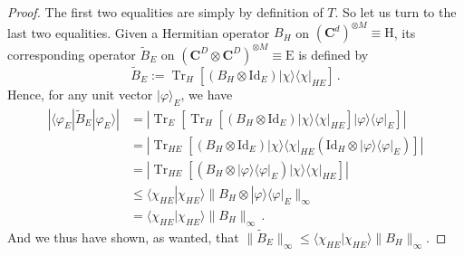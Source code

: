 \documentclass{amsart}
\newcommand{\C}{\mathbf{C}}
\renewcommand{\leq}{\leqslant}
\newcommand{\Id}{\mathrm{Id}}
\DeclareMathOperator{\Tr}{Tr}
\newcommand{\braket}[2]{\langle #1 | #2\rangle}
\newcommand{\ketbra}[2]{| #1 \rangle\!\langle #2 |}
\newcommand{\bra}[1]{\langle #1 |}
\newcommand{\ket}[1]{| #1 \rangle}
\begin{document}
\begin{proof}
    The first two equalities are simply by definition of $T$. So let us turn to the last two equalities. Given a Hermitian operator $B_H$ on $(\C^d)^{\otimes M}\equiv\mathrm{H}$, its corresponding operator $\tilde{B}_E$ on $(\C^D\otimes\C^D)^{\otimes M}\equiv\mathrm{E}$ is defined by
    \[ \tilde{B}_E := \Tr_H\left[(B_H\otimes\Id_E)\ketbra{\chi}{\chi}_{HE}\right] \, . \]
    Hence, for any unit vector $\ket{\varphi}_E$, we have
    \begin{align*}
        \left| \bra{\varphi_E}\tilde{B}_E\ket{\varphi_E} \right| & = \left| \Tr_E\left[\Tr_H\left[(B_H\otimes\Id_E)\ketbra{\chi}{\chi}_{HE}\right]\ketbra{\varphi}{\varphi}_E \right] \right| \\
                                                                 & = \left| \Tr_{HE}\left[(B_H\otimes\Id_E)\ketbra{\chi}{\chi}_{HE}(\Id_H\otimes\ketbra{\varphi}{\varphi}_E) \right] \right|  \\
                                                                 & = \left| \Tr_{HE}\left[(B_H\otimes\ketbra{\varphi}{\varphi}_E)\ketbra{\chi}{\chi}_{HE} \right] \right|                     \\
                                                                 & \leq \braket{\chi_{HE}}{\chi_{HE}} \|B_H\otimes\ketbra{\varphi}{\varphi}_E\|_{\infty}                                      \\
                                                                 & = \braket{\chi_{HE}}{\chi_{HE}} \|B_H\|_{\infty} \, .
    \end{align*}
    And we thus have shown, as wanted, that $\|\tilde{B}_E\|_{\infty} \leq \braket{\chi_{HE}}{\chi_{HE}} \|B_H\|_{\infty}$.
\end{proof}
\end{document}
